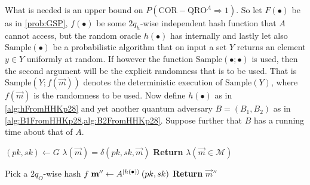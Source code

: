 What is needed is an upper bound on $P\left(\mathrm{COR-QRO}^A \Rightarrow 1\right)$. So let $F\left(\bullet\right)$ be as in \cref{prob:GSP}, $f\left(\bullet\right)$ be some $2q_h$-wise independent hash function that $A$ cannot access, but the random oracle $h\left(\bullet\right)$ has internally and lastly let also $\mathrm{Sample}\left(\bullet\right)$ be a probabilistic algorithm that on input a set $Y$ returns an element $y \in Y$ uniformly at random. If however the function $\mathrm{Sample}\left(\bullet; \bullet\right)$ is used, then the second argument will be the explicit randomness that is to be used. That is $\mathrm{Sample}\left(Y; f\left(\vec{m}\right)\right)$ denotes the deterministic execution of $\mathrm{Sample}\left(Y\right)$, where $f\left(\vec{m}\right)$ is the randomness to be used. Now define $h\left(\bullet\right)$ as in \cref{alg:hFromHHKp28} and yet another quantum adversary $B = \left(B_1, B_2\right)$ as in \cref{alg:B1FromHHKp28,alg:B2FromHHKp28}. Suppose further that $B$ has a running time about that of $A$.
%
\begin{center}
\begin{minipage}[ht!]{0.6\textwidth}
	\begin{algorithm}[H]
		\centering
		\caption{$B_1$}
		\label{alg:B1FromHHKp28}
		\begin{algorithmic}
			\State $\left(pk, sk\right) \leftarrow G$
				\State $\lambda\left(\vec{m}\right) = \delta\left(pk, sk, \vec{m}\right)$
			\EndFor
			\State \textbf{Return} $\lambda\left(\vec{m} \in \mathcal{M}\right)$
		\end{algorithmic}
	\end{algorithm}
\end{minipage}
\end{center}
\begin{center}
\begin{minipage}[ht!]{0.6\textwidth}
	\begin{algorithm}[H]
		\centering
		\caption{$B_2^{\ket{F\left(\bullet\right)}}$}
		\label{alg:B2FromHHKp28}
		\begin{algorithmic}
			\State Pick a $2q_O$-wise hash $f$
			\State $\boldsymbol{\mathrm{m}}'' \leftarrow A^{\lvert h\left(\bullet\right)\rangle}\left(pk,sk\right)$
			\State \textbf{Return} $\vec{m}''$
		\end{algorithmic}
	\end{algorithm}
\end{minipage}
\end{center}

